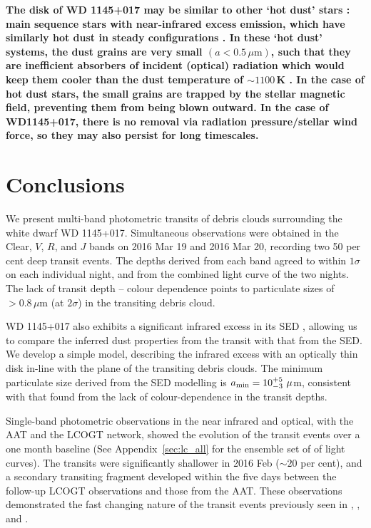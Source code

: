 \documentclass[useAMS,usenatbib]{mn2e}
\begin{document}
\textbf{The disk of WD 1145+017 may be similar to other ‘hot dust’ stars \citep[e.g.][]{2013A&A...555A.104A,2014A&A...561A.114E,2016MNRAS.459.2893M}: main sequence stars with near-infrared excess emission, which have similarly hot dust in steady configurations \citep{2015Msngr.159...24E}. In these `hot dust' systems, the dust grains are very small $(a < 0.5 \, \mu\mathrm{m})$, such that they are inefficient absorbers of incident (optical) radiation which would keep them cooler than the dust temperature of $\sim 1100$\,K \citep{2016ApJ...816...50R}. In the case of hot dust stars, the small grains are trapped by the stellar magnetic field, preventing them from being blown outward. In the case of WD1145+017, there is no removal via radiation pressure/stellar wind force, so they may also persist for long timescales. }

\section{Conclusions}
\label{sec:conclusions}

We present multi-band photometric transits of debris clouds surrounding the white dwarf WD 1145+017. Simultaneous observations were obtained in the Clear, $V$, $R$, and $J$ bands on 2016 Mar 19 and 2016 Mar 20, recording two 50 per cent deep transit events. The depths derived from each band agreed to within $1\sigma$ on each individual night, and from the combined light curve of the two nights. The lack of transit depth -- colour dependence points to particulate sizes of $>0.8\,\mu\mathrm{m}$ (at $2\sigma$) in the transiting debris cloud.

WD 1145+017 also exhibits a significant infrared excess in its SED \citep{2015Natur.526..546V,2016ApJ...816L..22X}, allowing us to compare the inferred dust properties from the transit with that from the SED. We develop a simple model, describing the infrared excess with an optically thin disk in-line with the plane of the transiting debris clouds. The minimum particulate size derived from the SED modelling is $a_{\rm min} = 10^{+5}_{-3}~\mu$m, consistent with that found from the lack of colour-dependence in the transit depths.

Single-band photometric observations in the near infrared and optical, with the AAT and the LCOGT network, showed the evolution of the transit events over a one month baseline (See Appendix~\ref{sec:lc_all} for the ensemble set of of light curves). The transits were significantly shallower in 2016 Feb ($\sim 20$ per cent), and a secondary transiting fragment developed within the five days between the follow-up LCOGT observations and those from the AAT.  These observations demonstrated the fast changing nature of the transit events previously seen in \citet{2016MNRAS.tmp..406R}, \citet{2015arXiv151006434C}, and \citet{2016ApJ...818L...7G}.
\end{document}

